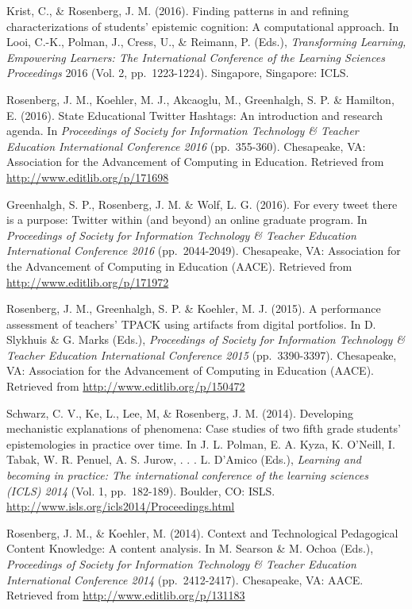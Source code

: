 \documentclass[14,]{article}
\begin{document}
Krist, C., \& Rosenberg, J. M. (2016). Finding patterns in and refining
characterizations of students' epistemic cognition: A computational
approach. In Looi, C.-K., Polman, J., Cress, U., \& Reimann, P. (Eds.),
\emph{Transforming Learning, Empowering Learners: The International
Conference of the Learning Sciences Proceedings} 2016 (Vol. 2,
pp.~1223-1224). Singapore, Singapore: ICLS.

Rosenberg, J. M., Koehler, M. J., Akcaoglu, M., Greenhalgh, S. P. \&
Hamilton, E. (2016). State Educational Twitter Hashtags: An introduction
and research agenda. In \emph{Proceedings of Society for Information
Technology \& Teacher Education International Conference 2016}
(pp.~355-360). Chesapeake, VA: Association for the Advancement of
Computing in Education. Retrieved from
\url{http://www.editlib.org/p/171698}

Greenhalgh, S. P., Rosenberg, J. M. \& Wolf, L. G. (2016). For every
tweet there is a purpose: Twitter within (and beyond) an online graduate
program. In \emph{Proceedings of Society for Information Technology \&
Teacher Education International Conference 2016} (pp.~2044-2049).
Chesapeake, VA: Association for the Advancement of Computing in
Education (AACE). Retrieved from \url{http://www.editlib.org/p/171972}

Rosenberg, J. M., Greenhalgh, S. P. \& Koehler, M. J. (2015). A
performance assessment of teachers' TPACK using artifacts from digital
portfolios. In D. Slykhuis \& G. Marks (Eds.), \emph{Proceedings of
Society for Information Technology \& Teacher Education International
Conference 2015} (pp.~3390-3397). Chesapeake, VA: Association for the
Advancement of Computing in Education (AACE). Retrieved from
\url{http://www.editlib.org/p/150472}

Schwarz, C. V., Ke, L., Lee, M, \& Rosenberg, J. M. (2014). Developing
mechanistic explanations of phenomena: Case studies of two fifth grade
students' epistemologies in practice over time. In J. L. Polman, E. A.
Kyza, K. O'Neill, I. Tabak, W. R. Penuel, A. S. Jurow, . . . L. D'Amico
(Eds.), \emph{Learning and becoming in practice: The international
conference of the learning sciences (ICLS) 2014} (Vol. 1, pp.~182-189).
Boulder, CO: ISLS. \url{http://www.isls.org/icls2014/Proceedings.html}

Rosenberg, J. M., \& Koehler, M. (2014). Context and Technological
Pedagogical Content Knowledge: A content analysis. In M. Searson \& M.
Ochoa (Eds.), \emph{Proceedings of Society for Information Technology \&
Teacher Education International Conference 2014} (pp.~2412-2417).
Chesapeake, VA: AACE. Retrieved from
\url{http://www.editlib.org/p/131183}
\end{document}
